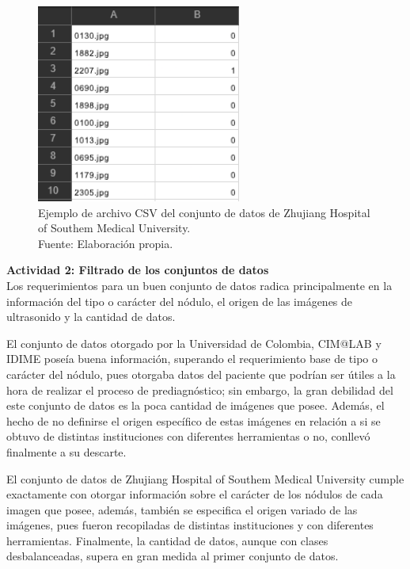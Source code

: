 \begin{figure}[H]
	\begin{center}
		\includegraphics[width=0.60\textwidth]{4/figures/tn3k_csv.PNG}
		\caption[Ejemplo de archivo CSV del conjunto de datos de Zhujiang Hospital of Southem Medical University]{Ejemplo de archivo CSV del conjunto de datos de Zhujiang Hospital of Southem Medical University. \\
		Fuente: Elaboración propia.}
		\label{4:fig105}
	\end{center}
\end{figure}

\textbf{Actividad 2: Filtrado de los conjuntos de datos}
\\
Los requerimientos para un buen conjunto de datos radica principalmente en la información del tipo o carácter del nódulo, el origen de las imágenes de ultrasonido y la cantidad de datos.

El conjunto de datos otorgado por la Universidad de Colombia, CIM@LAB y IDIME poseía buena información, superando el requerimiento base de tipo o carácter del nódulo, pues otorgaba datos del paciente que podrían ser útiles a la hora de realizar el proceso de prediagnóstico; sin embargo, la gran debilidad del este conjunto de datos es la poca cantidad de imágenes que posee. Además, el hecho de no definirse el origen específico de estas imágenes en relación a si se obtuvo de distintas instituciones con diferentes herramientas o no, conllevó finalmente a su descarte.

El conjunto de datos de Zhujiang Hospital of Southem Medical University cumple exactamente con otorgar información sobre el carácter de los nódulos de cada imagen que posee, además, también se especifica el origen variado de las imágenes, pues fueron recopiladas de distintas instituciones y con diferentes herramientas. Finalmente, la cantidad de datos, aunque con clases desbalanceadas, supera en gran medida al primer conjunto de datos.


